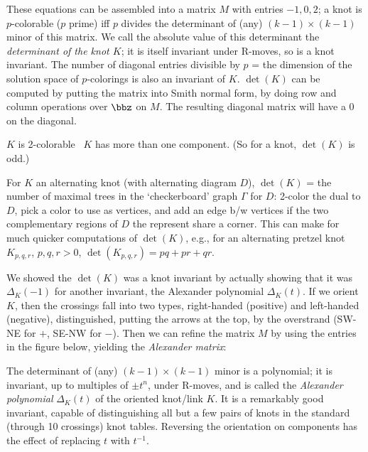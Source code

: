 These equations can be assembled into a matrix $M$ with entries $-1,0,2$; a knot is $p$-colorable ($p$ prime) iff
$p$ divides the determinant of (any) $(k-1)\times(k-1)$ minor of this matrix. We call the absolute value of
this determinant
the {\it determinant of the knot $K$}; it is itself invariant under R-moves, so is a knot invariant.
The number of diagonal entries divisible by $p$ = the dimension of the solution space of $p$-colorings
is also an invariant of $K$.
$\det(K)$ can be computed by putting the matrix into Smith normal form, by doing row and column
operations over $\bbz$ on $M$. The resulting diagonal matrix will have a $0$ on the diagonal. 

\ssk

$K$ is 2-colorable \lra\ $K$ has more than one component. (So for a knot, $\det(K)$ is odd.)

For $K$ an alternating knot (with alternating diagram $D$), 
$\det(K)$ = the number of maximal trees in the `checkerboard' graph $\Gamma$ for $D$: 2-color
the dual to $D$, pick a color to use as vertices, and add an edge b/w vertices if the two
complementary regions of $D$ the represent share a corner. This can make for much quicker
computations of $\det(K)$, e.g., for an alternating pretzel knot $K_{p,q,r}$, $p,q,r>0$, 
$\det(K_{p,q,r})=pq+pr+qr$.

\ssk

We showed the $\det(K)$ was a knot invariant by actually showing that it was $\Delta_K(-1)$ for another
invariant, the Alexander polynomial $\Delta_K(t)$. If we orient $K$, then the crossings fall into two
types, right-handed (positive) and left-handed (negative), distinguished, putting the arrows at the top,
by the overstrand (SW-NE for $+$, SE-NW for $-$). Then we can refine the matrix $M$ by using the entries
in the figure below, yielding the {\it Alexander matrix}:


\ssk


\ssk

The determinant of (any) $(k-1)\times(k-1)$ minor is a polynomial; it is invariant, up to 
multiples of $\pm t^n$, under R-moves, and is called the {\it Alexander polynomial} $\Delta_K(t)$ 
of the oriented knot/link $K$. It is a remarkably good invariant, capable of distinguishing
all but a few pairs of knots in the standard (through 10 crossings) knot tables. Reversing the
orientation on  components has the effect of replacing $t$ with $t^{-1}$.


